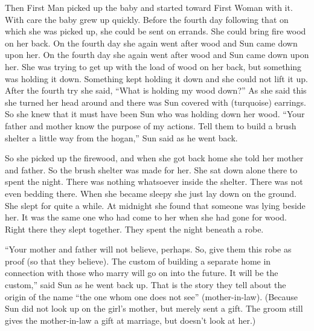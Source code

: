 Then First Man picked up the baby and started toward First Woman with it. With care the baby grew up quickly. Before the fourth day following that on which she was picked up, she could be sent on errands. She could bring fire wood on her back. On the fourth day she again went after wood and Sun came down upon her. On the fourth day she again went after wood and Sun came down upon her. She was trying to get up with the load of wood on her back, but something was holding it down. Something kept holding it down and she could not lift it up. After the fourth try she said, ``What is holding my wood down?'' As she said this she turned her head around and there was Sun covered with (turquoise) earrings. So she knew that it must have been Sun who was holding down her wood. ``Your father and mother know the purpose of my actions. Tell them to build a brush shelter a little way from the hogan,'' Sun said as he went back.

So she picked up the firewood, and when she got back home she told her mother and father. So the brush shelter was made for her. She sat down alone there to spent the night. There was nothing whatsoever inside the shelter. There was not even bedding there. When she became sleepy she just lay down on the ground. She slept for quite a while. At midnight she found that someone was lying beside her. It was the same one who had come to her when she had gone for wood. Right there they slept together. They spent the night beneath a robe.

``Your mother and father will not believe, perhaps. So, give them this robe as proof (so that they believe). The custom of building a separate home in connection with those who marry will go on into the future. It will be the custom,'' said Sun as he went back up. That is the story they tell about the origin of the name ``the one whom one does not see'' (mother-in-law). (Because Sun did not look up on the girl's mother, but merely sent a gift. The groom still gives the mother-in-law a gift at marriage, but doesn't look at her.)